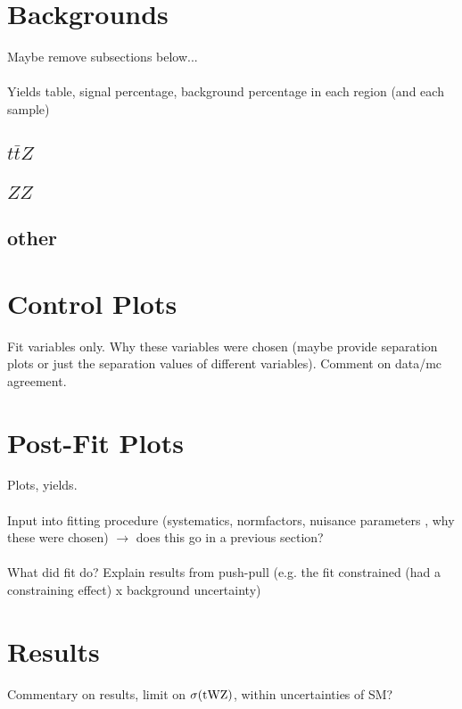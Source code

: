  
\section{Backgrounds}
Maybe remove subsections below...\\\\
Yields table, signal percentage, background percentage in each region (and each sample)


\subsection{$t\bar{t}Z$}
\subsection{$ZZ$}
\subsection{other}
\section{Control Plots}
Fit variables only. Why these variables were chosen (maybe provide separation plots or just the separation values of different variables). Comment on data/mc agreement.
\section{Post-Fit Plots}
Plots, yields. \\\\
Input into fitting procedure (systematics, normfactors, nuisance parameters , why these were chosen) $\rightarrow$ does this go in a previous section?\\\\
What did fit do? Explain results from push-pull (e.g. the fit constrained (had a constraining effect) x background uncertainty)
\section{Results}
Commentary on results, limit on $\sigma (\tWZ)$, within uncertainties of SM?